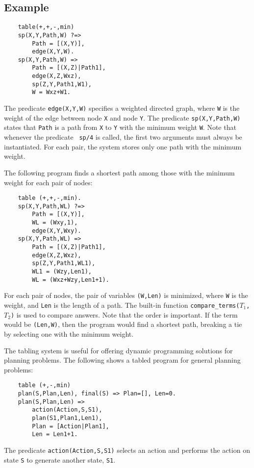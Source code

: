 \subsection*{Example}
\begin{verbatim}
    table(+,+,-,min)
    sp(X,Y,Path,W) ?=>
        Path = [(X,Y)],
        edge(X,Y,W).
    sp(X,Y,Path,W) =>
        Path = [(X,Z)|Path1],
        edge(X,Z,Wxz),
        sp(Z,Y,Path1,W1),
        W = Wxz+W1.
\end{verbatim}
The predicate \texttt{edge(X,Y,W)} specifies a weighted directed graph, where \texttt{W} is the weight of the edge between node \texttt{X} and node \texttt{Y}. The predicate \texttt{sp(X,Y,Path,W)} states that \texttt{Path} is a path from \texttt{X} to \texttt{Y} with the minimum weight \texttt{W}. Note that whenever the predicate \texttt{ sp/4} is called, the first two arguments must always be instantiated. For each pair, the system stores only one path with the minimum weight. 

The following program finds a shortest path among those with the minimum weight for each pair of nodes:
\begin{verbatim}
    table (+,+,-,min).
    sp(X,Y,Path,WL) ?=>
        Path = [(X,Y)],
        WL = (Wxy,1),
        edge(X,Y,Wxy).
    sp(X,Y,Path,WL) =>
        Path = [(X,Z)|Path1],
        edge(X,Z,Wxz),
        sp(Z,Y,Path1,WL1),
        WL1 = (Wzy,Len1),
        WL = (Wxz+Wzy,Len1+1).
\end{verbatim}
For each pair of nodes, the pair of variables \texttt{(W,Len)} is minimized, where \texttt{W} is the weight, and \texttt{Len} is the length of a path. The built-in function \texttt{compare\_terms($T_1$,$T_2$)} is used to compare answers. Note that the order is important. If the term would be \texttt{(Len,W)}, then the program would find a shortest path, breaking a tie by selecting one with the minimum weight.

The tabling system is useful for offering dynamic programming solutions for planning problems. The following shows a tabled program for general planning problems:
\begin{verbatim}
    table (+,-,min)
    plan(S,Plan,Len), final(S) => Plan=[], Len=0.
    plan(S,Plan,Len) =>
        action(Action,S,S1),
        plan(S1,Plan1,Len1),
        Plan = [Action|Plan1],
        Len = Len1+1.
\end{verbatim}
The predicate \texttt{action(Action,S,S1)} selects an action and performs the action on state \texttt{S} to generate another state, \texttt{S1}.

